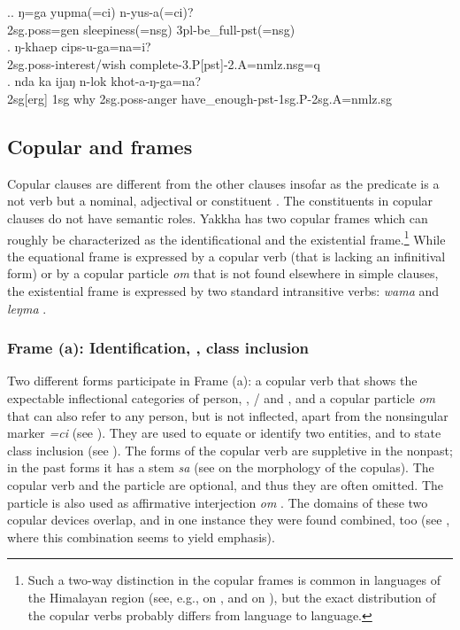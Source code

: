\ex.\ag. ŋ=ga yupma(=ci) n-yus-a(=ci)?\\	
		{\sc 2sg.poss=gen} sleepiness{\sc (=nsg)} 	{\sc 3pl}-be\_full{\sc -pst(=nsg)}\\
		\bg. ŋ-khaep cips-u-ga=na=i?\\
	{\sc 2sg.poss-}interest/wish complete{\sc -3.P[pst]-2.A=nmlz.nsg=q}\\
	\bg. nda ka ijaŋ n-lok khot-a-ŋ-ga=na?\\
	{\sc 2sg[erg]} {\sc 1sg} why {\sc 2sg.poss}-anger have\_enough{\sc -pst-1sg.P-2sg.A=nmlz.sg}\\


\subsection{Copular and  frames}\label{cop}

Copular clauses are different from the other clauses insofar as the predicate is a not verb but a nominal, adjectival or  constituent \citep[225]{Dryer2007Clause}. The constituents in copular clauses do not have semantic roles. Yakkha has two copular frames which can roughly be characterized as the identificational and the existential frame.\footnote{Such a two-way distinction in the copular frames is common in languages of the Himalayan region (see, e.g., \citet{Genetti2007_Newari} on , and \citet{Matthews1984Course} on ), but the exact distribution of the copular verbs probably differs from language to language.} While the equational frame is expressed by a copular verb (that is lacking an infinitival form) or by a copular particle \emph{om} that is not found elsewhere in simple clauses, the existential frame is expressed by two standard intransitive verbs: \emph{wama}  and \emph{leŋma} . 

\subsubsection{Frame (a): Identification, ,  class inclusion}

Two different forms participate in Frame (a): a copular verb that shows the expectable inflectional categories of person, , / and , and a copular particle \emph{om} that can also refer to any person, but is not inflected, apart from the nonsingular marker \emph{=ci} (see \Next[c]). They are used to equate or identify two entities, and to state class inclusion (see \Next).  The forms of the copular verb are suppletive in the nonpast; in the past forms it has a stem \emph{sa} (see  on the morphology of the copulas). The copular verb and the particle are optional, and thus they are often omitted. The particle is also used as affirmative interjection \emph{om} .  The domains of these two copular devices overlap, and in one instance they were found combined, too (see \Next[d], where this combination seems to yield emphasis).
 
